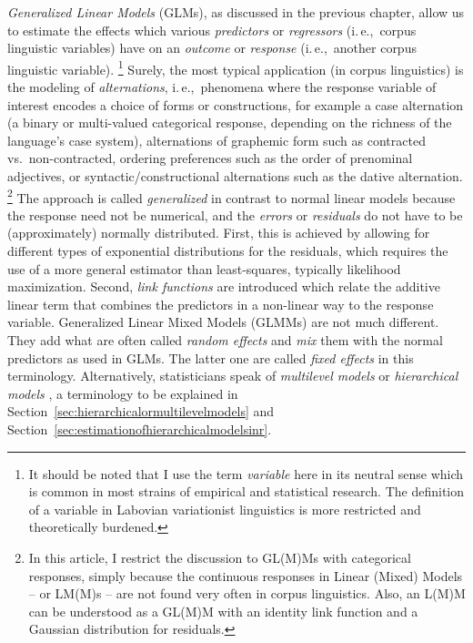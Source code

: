 \documentclass[a4paper,12pt]{article}
\newcommand{\ie}{i.\,e.,\ }
\begin{document}
\textit{Generalized Linear Models} (GLMs), as discussed in the previous chapter, allow us to estimate the effects which various \textit{predictors} or \textit{regressors} (\ie corpus linguistic variables) have on an \textit{outcome} or \textit{response} (\ie another corpus linguistic variable).%
\footnote{It should be noted that I use the term \textit{variable} here in its neutral sense which is common in most strains of empirical and statistical research.
The definition of a variable in Labovian variationist linguistics is more restricted and theoretically burdened.}
Surely, the most typical application (in corpus linguistics) is the modeling of \textit{alternations}, \ie phenomena where the response variable of interest encodes a choice of forms or constructions, for example a case alternation (a binary or multi-valued categorical response, depending on the richness of the language's case system), alternations of graphemic form such as contracted vs.\ non-contracted, ordering preferences such as the order of prenominal adjectives, or syntactic\slash constructional alternations such as the dative alternation.%
\footnote{In this article, I restrict the discussion to GL(M)Ms with categorical responses, simply because the continuous responses in Linear (Mixed) Models -- or LM(M)s – are not found very often in corpus linguistics.
Also, an L(M)M can be understood as a GL(M)M with an identity link function and a Gaussian distribution for residuals.}
The approach is called \textit{generalized} in contrast to normal linear models because the response need not be numerical, and the \textit{errors} or \textit{residuals} do not have to be (approximately) normally distributed.
First, this is achieved by allowing for different types of exponential distributions for the residuals, which requires the use of a more general estimator than least-squares, typically likelihood maximization.
Second, \textit{link functions} are introduced which relate the additive linear term that combines the predictors in a non-linear way to the response variable.
Generalized Linear Mixed Models (GLMMs) are not much different.
They add what are often called \textit{random effects} and \textit{mix} them with the normal predictors as used in GLMs.
The latter one are called \textit{fixed effects} in this terminology.
Alternatively, statisticians speak of \textit{multilevel models} or \textit{hierarchical models} \citep{GelmanHill2006}, a terminology to be explained in Section~\ref{sec:hierarchicalormultilevelmodels} and Section~\ref{sec:estimationofhierarchicalmodelsinr}.
\end{document}
